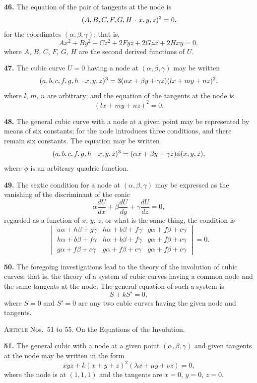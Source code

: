 \documentclass[11pt,a4paper]{article}
\theoremstyle{plain}
\theoremstyle{definition}
\newcommand{\lc}{\kern.17em\raise.5ex\hbox{.}\kern.08em}  %
\begin{document}
\textbf{46.} The equation of the pair of tangents at the node is
\[
(A, B, C, F, G, H \mathbin{\lc} x, y, z)^2 = 0,
\]
for the coordinates $(\alpha, \beta, \gamma)$; that is,
\[
Ax^2 + By^2 + Cz^2 + 2Fyz + 2Gzx + 2Hxy = 0,
\]
where $A$, $B$, $C$, $F$, $G$, $H$ are the second derived functions of $U$.

\textbf{47.} The cubic curve $U = 0$ having a node at $(\alpha, \beta, \gamma)$ may be written
\[
(a, b, c, f, g, h \mathbin{\lc} x, y, z)^3 = 3(\alpha x + \beta y + \gamma z)(lx + my + nz)^2,
\]
where $l$, $m$, $n$ are arbitrary; and the equation of the tangents at the node is
\[
(lx + my + nz)^2 = 0.
\]

\textbf{48.} The general cubic curve with a node at a given point may be represented by means of six constants; for the node introduces three conditions, and there remain six constants. The equation may be written
\[
(a, b, c, f, g, h \mathbin{\lc} x, y, z)^3 = (\alpha x + \beta y + \gamma z)\phi(x, y, z),
\]
where $\phi$ is an arbitrary quadric function.

\textbf{49.} The sextic condition for a node at $(\alpha, \beta, \gamma)$ may be expressed as the vanishing of the discriminant of the conic
\[
\alpha\frac{dU}{dx} + \beta\frac{dU}{dy} + \gamma\frac{dU}{dz} = 0,
\]
regarded as a function of $x$, $y$, $z$; or what is the same thing, the condition is
\[
\begin{vmatrix}
a\alpha + h\beta + g\gamma & h\alpha + b\beta + f\gamma & g\alpha + f\beta + c\gamma \\
h\alpha + b\beta + f\gamma & h\alpha + b\beta + f\gamma & g\alpha + f\beta + c\gamma \\
g\alpha + f\beta + c\gamma & g\alpha + f\beta + c\gamma & g\alpha + f\beta + c\gamma
\end{vmatrix} = 0.
\]

\textbf{50.} The foregoing investigations lead to the theory of the involution of cubic curves; that is, the theory of a system of cubic curves having a common node and the same tangents at the node. The general equation of such a system is
\[
S + kS' = 0,
\]
where $S = 0$ and $S' = 0$ are any two cubic curves having the given node and tangents.

\bigskip

\noindent\textsc{Article} Nos.~51 to 55.  On the Equations of the Involution.

\medskip

\textbf{51.} The general cubic with a node at a given point $(\alpha, \beta, \gamma)$ and given tangents at the node may be written in the form
\[
xyz + k(x + y + z)^2(\lambda x + \mu y + \nu z) = 0,
\]
where the node is at $(1, 1, 1)$ and the tangents are $x = 0$, $y = 0$, $z = 0$.
\end{document}

